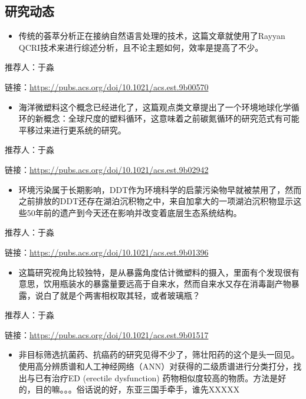 \documentclass[]{book}
\providecommand{\tightlist}{%
  \setlength{\itemsep}{0pt}\setlength{\parskip}{0pt}}
\begin{document}
\hypertarget{ux7814ux7a76ux52a8ux6001-19}{%
\subsection*{研究动态}\label{ux7814ux7a76ux52a8ux6001-19}}

\begin{itemize}
\tightlist
\item
  传统的荟萃分析正在接纳自然语言处理的技术，这篇文章就使用了Rayyan QCRI技术来进行综述分析，且不论主题如何，效率是提高了不少。
\end{itemize}

推荐人：于淼

链接：\url{https://pubs.acs.org/doi/10.1021/acs.est.9b00570}

\begin{itemize}
\tightlist
\item
  海洋微塑料这个概念已经进化了，这篇观点类文章提出了一个环境地球化学循环的新概念：全球尺度的塑料循环，这意味着之前碳氮循环的研究范式有可能平移过来进行更系统的研究。
\end{itemize}

推荐人：于淼

链接：\url{https://pubs.acs.org/doi/10.1021/acs.est.9b02942}

\begin{itemize}
\tightlist
\item
  环境污染属于长期影响，DDT作为环境科学的启蒙污染物早就被禁用了，然而之前排放的DDT还存在湖泊沉积物之中，来自加拿大的一项湖泊沉积物显示这些50年前的遗产到今天还在影响并改变着底层生态系统结构。
\end{itemize}

推荐人：于淼

链接：\url{https://pubs.acs.org/doi/10.1021/acs.est.9b01396}

\begin{itemize}
\tightlist
\item
  这篇研究视角比较独特，是从暴露角度估计微塑料的摄入，里面有个发现很有意思，饮用瓶装水的暴露量要远高于自来水，然而自来水又存在消毒副产物暴露，说白了就是个两害相权取其轻，或者玻璃瓶？
\end{itemize}

推荐人：于淼

链接：\url{https://pubs.acs.org/doi/10.1021/acs.est.9b01517}

\begin{itemize}
\tightlist
\item
  非目标筛选抗菌药、抗癌药的研究见得不少了，筛壮阳药的这个是头一回见。使用高分辨质谱和人工神经网络（ANN）对获得的二级质谱进行分类打分，找出与已有治疗ED (erectile dysfunction) 药物相似度较高的物质。方法是好的，目的嘛。。。俗话说的好，东亚三国手牵手，谁先XXXXX
\end{itemize}
\end{document}

